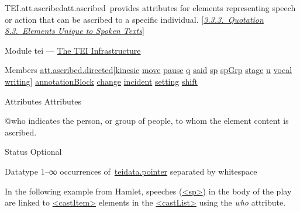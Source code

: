 \begin{reflist}
\item[]\begin{specHead}{TEI.att.ascribed}{att.ascribed} provides attributes for elements representing speech or action that can be ascribed to a specific individual. [\textit{\hyperref[COHQQ]{3.3.3.\ Quotation}} \textit{\hyperref[TSBA]{8.3.\ Elements Unique to Spoken Texts}}]\end{specHead} 
    \item[{Module}]
  tei — \hyperref[ST]{The TEI Infrastructure}
    \item[{Members}]
  \hyperref[TEI.att.ascribed.directed]{att.ascribed.directed}[\hyperref[TEI.kinesic]{kinesic} \hyperref[TEI.move]{move} \hyperref[TEI.pause]{pause} \hyperref[TEI.q]{q} \hyperref[TEI.said]{said} \hyperref[TEI.sp]{sp} \hyperref[TEI.spGrp]{spGrp} \hyperref[TEI.stage]{stage} \hyperref[TEI.u]{u} \hyperref[TEI.vocal]{vocal} \hyperref[TEI.writing]{writing}] \hyperref[TEI.annotationBlock]{annotationBlock} \hyperref[TEI.change]{change} \hyperref[TEI.incident]{incident} \hyperref[TEI.setting]{setting} \hyperref[TEI.shift]{shift}
    \item[{Attributes}]
  Attributes\hfil\\[-10pt]\begin{sansreflist}
    \item[@who]
  indicates the person, or group of people, to whom the element content is ascribed.
\begin{reflist}
    \item[{Status}]
  Optional
    \item[{Datatype}]
  1–∞ occurrences of \hyperref[TEI.teidata.pointer]{teidata.pointer} separated by whitespace
    \item[]In the following example from Hamlet, speeches (\hyperref[TEI.sp]{<sp>}) in the body of the play are linked to \hyperref[TEI.castItem]{<castItem>} elements in the \hyperref[TEI.castList]{<castList>} using the {\itshape who} attribute.\mbox{}\newline 

\end{reflist}
\end{sansreflist}
\end{reflist}
